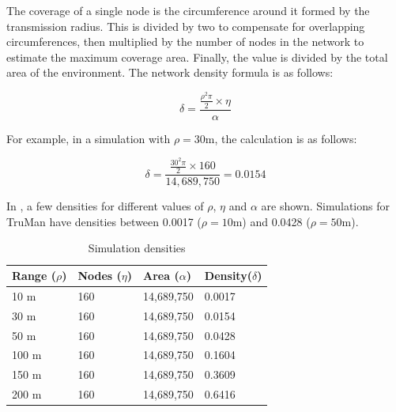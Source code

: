 The coverage of a single node is the circumference around it formed by the transmission radius. This is divided by two to compensate for overlapping circumferences, then multiplied by the number of nodes in the network to estimate the maximum coverage area.
Finally, the value is divided by the total area of the environment.
The network density formula is as follows:

$$ \delta = \frac{\frac{\rho^2\pi}{2} \times \eta}{\alpha} $$

For example, in a simulation with $\rho = 30$m, the calculation is as follows:

$$ \delta = \frac{\frac{30^2\pi}{2} \times 160}{14,689,750} = 0.0154$$

In , a few densities for different values of $\rho$, $\eta$ and $\alpha$ are shown. 
Simulations for TruMan have densities between 0.0017 ($\rho = 10$m) and 0.0428 ($\rho = 50$m).

\begin{table}[h!]
\caption{Simulation densities}
\label{table:simdensities}
\centering
\begin{tabular}{|p{2cm}|p{2cm}|p{2cm}|p{2cm}|}
 \hline
 \textbf{Range ($\rho$)} & \textbf{Nodes ($\eta$)} & \textbf{Area ($\alpha$)} & \textbf{Density($\delta$)} \\
 \hline
 \hline
 10 m & 160 & 14,689,750 & 0.0017 \\
 \hline
 30 m & 160 & 14,689,750 & 0.0154 \\
 \hline
 50 m & 160 & 14,689,750 & 0.0428 \\
 \hline
 100 m & 160 & 14,689,750 & 0.1604 \\
 \hline
 150 m & 160 & 14,689,750 & 0.3609 \\
 \hline
 200 m & 160 & 14,689,750 & 0.6416 \\
 \hline
\end{tabular}
\end{table}


